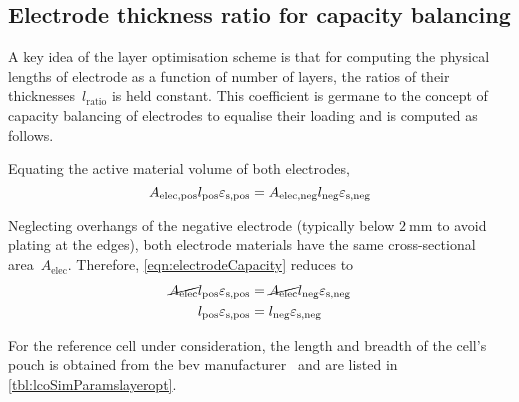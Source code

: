 
\subsection{Electrode thickness ratio for capacity balancing}

A key  idea of the layer  optimisation scheme is that  for computing the
physical  lengths  of electrode  as  a  function  of number  of  layers,
the  ratios  of  their thicknesses~$l_\text{ratio}$  is  held  constant.
This  coefficient is  germane to  the concept  of capacity  balancing of
electrodes  to equalise  their loading and is computed as follows.

Equating  the active material volume of both electrodes,
\begin{equation}
    A_\text{elec,pos}l_\text{pos}  \varepsilon_\text{s,pos} = A_\text{elec,neg}l_\text{neg}  \varepsilon_\text{s,neg} \label{eqn:electrodeCapacity}\\
\end{equation}

Neglecting  overhangs   of  the  negative  electrode   (typically  below
$\SI{2}{\milli\meter}$ to  avoid plating  at the edges),  both electrode
materials have the same cross-sectional area~$A_\text{elec}$. Therefore,
\cref{eqn:electrodeCapacity} reduces to
\begin{align}
    \cancel{A_\text{elec}}l_\text{pos}  \varepsilon_\text{s,pos} & = \cancel{A_\text{elec}}l_\text{neg}  \varepsilon_\text{s,neg}  \\
    l_\text{pos}  \varepsilon_\text{s,pos}                       & = l_\text{neg}  \varepsilon_\text{s,neg}\label{eqn:electrodeCapequalarea}
\end{align}

For the reference cell under consideration, the length and breadth of the cell's
pouch is  obtained from the \gls{bev}  manufacturer~\cite{GMBoltBatteryDims} and
are listed in \cref{tbl:lcoSimParamslayeropt}.




